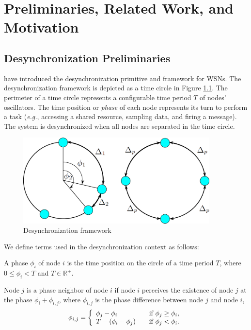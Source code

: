 \chapter{Preliminaries, Related Work, and Motivation}
\label{chap:related}

\section{Desynchronization Preliminaries}
\cite{4379660} have introduced the desynchronization primitive and framework for WSNs.
The desynchronization framework is depicted as a time circle in Figure \ref{fig:time_circle}.
The perimeter of a time circle represents a configurable time period $T$ of nodes' oscillators.
The time position or \textit{phase} of each node represents its turn to perform a task (\textit{e.g.}, accessing a shared resource, sampling data, and firing a message).
The system is desynchronized when all nodes are separated in the time circle. 

\begin{figure}[t]
\centering
\includegraphics[width=4.0in]{figure/time_circle}
\caption{Desynchronization framework}
\label{fig:time_circle}
\end{figure}

We define terms used in the desynchronization context as follows:

\begin{defn}[Phase]
A phase $\phi_i$ of node $i$ is the time position on the circle of a time period $T$, where $0 \leq \phi_i <  T$ and $T \in \mathbb{R}^+$.
\end{defn}

\begin{defn}
Node $j$ is a phase neighbor of node $i$ if node $i$ perceives the existence of node $j$ at the phase $\phi_i + \phi_{i,j}$, where $\phi_{i,j}$ is the phase difference between node $j$ and node $i$,
\begin{equation}
\phi_{i,j} = \left\{ 
\begin{array}{l l}
  \phi_j - \phi_i & \quad \mbox{if $\phi_j \geq \phi_i$,}\\
  T - (\phi_i - \phi_j) & \quad \mbox{if $\phi_j < \phi_i$.}\\ \end{array} \right. 
\end{equation}
\end{defn}

